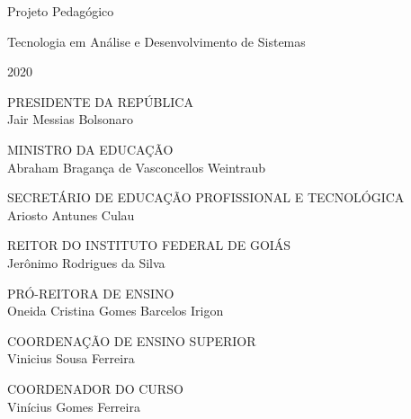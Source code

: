 \documentclass[11pt,fleqn]{book} %
\begin{document}
\let\cleardoublepage\clearpage

\renewcommand{\chaptername}{Capítulo}
\renewcommand{\figurename}{Fig.}

\begingroup
	\thispagestyle{empty}
	
	
	
	
	\vspace*{4.5cm}
	
	\centering
	\par
	{\Huge Projeto Pedagógico}\vspace*{1.5cm}
	\par
	\fontsize{40}{40}
	\selectfont
	Tecnologia em Análise e Desenvolvimento de Sistemas
	\vspace*{10cm}
	\par
	{\Huge 2020}
	\par
\endgroup
\pagebreak

\begin{center}
	\par
	{\large PRESIDENTE DA REPÚBLICA \\ Jair Messias Bolsonaro}\vspace*{1cm}
	\par
	{\large MINISTRO DA EDUCAÇÃO \\ Abraham Bragança de Vasconcellos Weintraub}\vspace*{1cm}
	\par
	{\large SECRETÁRIO DE EDUCAÇÃO PROFISSIONAL E TECNOLÓGICA \\ Ariosto Antunes Culau}\vspace*{1cm}
	\par
	{\large REITOR DO INSTITUTO FEDERAL DE GOIÁS \\ Jerônimo Rodrigues da Silva}\vspace*{1cm}
	\par
	{\large PRÓ-REITORA DE ENSINO \\ Oneida Cristina Gomes Barcelos Irigon}\vspace*{1cm}
	\par
	{\large COORDENAÇÃO DE ENSINO SUPERIOR \\ Vinicius Sousa Ferreira}\vspace*{1cm}
	\par
	{\large COORDENADOR DO CURSO \\ Vinícius Gomes Ferreira}\vspace*{1cm}
\end{center}
\end{document}
